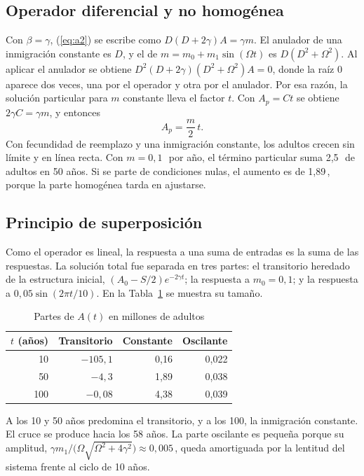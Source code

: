 \documentclass[10pt,twocolumn,letterpaper]{article}
\newcommand{\M}{\,\text{M}}
\begin{document}
\subsection{Operador diferencial y no homogénea}
Con $\beta=\gamma$, (\ref{eq:a2}) se escribe como $D(D+2\gamma)A=\gamma m$. El anulador de una inmigración constante es $D$, y el de $m=m_0+m_1\sin(\Omega t)$ es $D(D^2+\Omega^2)$. Al aplicar el anulador se obtiene $D^2(D+2\gamma)(D^2+\Omega^2)A=0$, donde la raíz 0 aparece dos veces, una por el operador y otra por el anulador. Por esa razón, la solución particular para $m$ constante lleva el factor $t$. Con $A_p=Ct$ se obtiene $2\gamma C=\gamma m$, y entonces
\begin{equation}
A_p=\frac{m}{2}\,t.
\end{equation}
Con fecundidad de reemplazo y una inmigración constante, los adultos crecen sin límite y en línea recta. Con $m=0{,}1$\M\ por año, el término particular suma 2,5\M\ de adultos en 50 años. Si se parte de condiciones nulas, el aumento es de 1,89\M, porque la parte homogénea tarda en ajustarse.

\subsection{Principio de superposición}
Como el operador es lineal, la respuesta a una suma de entradas es la suma de las respuestas. La solución total fue separada en tres partes: el transitorio heredado de la estructura inicial, $(A_0-S/2)e^{-2\gamma t}$; la respuesta a $m_0=0{,}1$; y la respuesta a $0{,}05\sin(2\pi t/10)$. En la Tabla~\ref{tab:sup} se muestra su tamaño.

\begin{table}[h]
\centering\small
\caption{Partes de $A(t)$ en millones de adultos}
\label{tab:sup}
\begin{tabular}{rrrr}
\toprule
$t$ (años) & Transitorio & Constante & Oscilante\\
\midrule
10 & $-105{,}1$ & 0,16 & 0,022\\
50 & $-4{,}3$ & 1,89 & 0,038\\
100 & $-0{,}08$ & 4,38 & 0,039\\
\bottomrule
\end{tabular}
\end{table}

A los 10 y 50 años predomina el transitorio, y a los 100, la inmigración constante. El cruce se produce hacia los 58 años. La parte oscilante es pequeña porque su amplitud, $\gamma m_1/\big(\Omega\sqrt{\Omega^2+4\gamma^2}\big)\approx0{,}005$\M, queda amortiguada por la lentitud del sistema frente al ciclo de 10 años.
\end{document}
